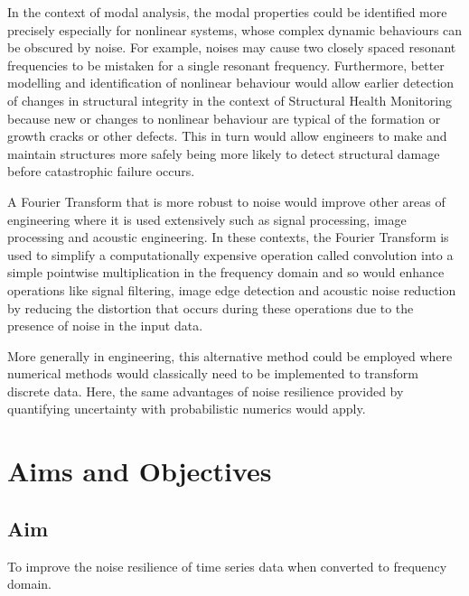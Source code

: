 \documentclass[12pt]{article}
\begin{document}
    In the context of modal analysis, the modal properties could be identified more precisely especially for nonlinear systems, whose complex dynamic behaviours can be obscured by noise.
    For example, noises may cause two closely spaced resonant frequencies to be mistaken for a single resonant frequency.
    Furthermore, better modelling and identification of nonlinear behaviour would allow earlier detection of changes in structural integrity in the context of Structural Health Monitoring because new or changes to nonlinear behaviour are typical of the formation or growth cracks or other defects.
    This in turn would allow engineers to make and maintain structures more safely being more likely to detect structural damage before catastrophic failure occurs.

    A Fourier Transform that is more robust to noise would improve other areas of engineering where it is used extensively such as signal processing, image processing and acoustic engineering.
    In these contexts, the Fourier Transform is used to simplify a computationally expensive operation called convolution into a simple pointwise multiplication in the frequency domain and so would enhance operations like signal filtering, image edge detection and acoustic noise reduction by reducing the distortion that occurs during these operations due to the presence of noise in the input data.


    More generally in engineering, this alternative method could be employed where numerical methods would classically need to be implemented to transform discrete data.
    Here, the same advantages of noise resilience provided by quantifying uncertainty with probabilistic numerics would apply.

    \section{Aims and Objectives}
    \subsection{Aim}
    To improve the noise resilience of time series data when converted to frequency domain.
\end{document}
